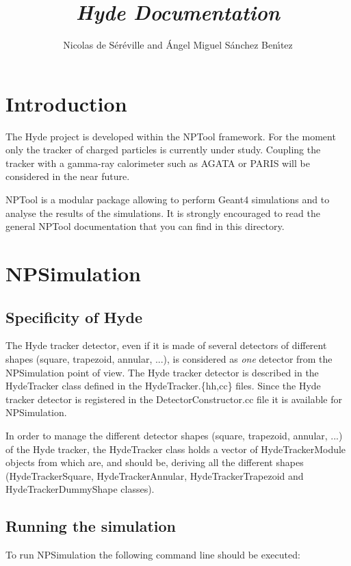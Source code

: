 \documentclass[a4paper,12pt]{article}
\begin{document}
\title{\emph{Hyde Documentation}}
\author{Nicolas de S\'er\'eville and {\'A}ngel Miguel S{\'a}nchez Ben\'{\i}tez}

\maketitle 
\pagebreak
\tableofcontents
\pagebreak


\section{Introduction}
The Hyde project is developed within the NPTool framework. For the 
moment only the tracker of charged particles is currently under study.
Coupling the tracker with a gamma-ray calorimeter such as AGATA or
PARIS will be considered in the near future. 

NPTool is a modular package allowing to perform Geant4 simulations and to 
analyse the results of the simulations. It is strongly encouraged to read 
the general NPTool documentation that you can find in this directory.


\section{NPSimulation}
\subsection{Specificity of Hyde}
The Hyde tracker detector, even if it is made of several detectors of
different shapes (square, trapezoid, annular, ...), is considered as {\it one} 
detector from the NPSimulation point of view. The Hyde tracker detector 
is described in the HydeTracker class defined in the 
HydeTracker.\{hh,cc\} files. Since the Hyde tracker detector is 
registered in the DetectorConstructor.cc file it is available for NPSimulation.

In order to manage the different detector shapes (square, trapezoid, annular, 
...) of the Hyde tracker, the HydeTracker class holds a vector of 
HydeTrackerModule objects from which are, and should be, deriving all 
the different shapes (HydeTrackerSquare, HydeTrackerAnnular,
HydeTrackerTrapezoid and HydeTrackerDummyShape classes).


\subsection{Running the simulation}
To run NPSimulation the following command line should be executed: 
\end{document}
